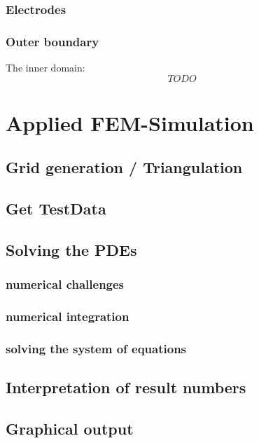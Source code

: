 \documentclass[parskip=half, titlepage=yes, 12pt, BCOR=12mm, DIV=calc]{scrartcl}
\begin{document}
\subsubsection{Electrodes}

\subsubsection{Outer boundary}

The inner domain: 
\begin{equation}
    TODO
\end{equation}



\section{Applied FEM-Simulation}

\subsection{Grid generation / Triangulation}

\subsection{Get TestData}

\subsection{Solving the PDEs}
\subsubsection{numerical challenges}
\subsubsection{numerical integration}
\subsubsection{solving the system of equations}

\subsection{Interpretation of result numbers}

\subsection{Graphical output}
\end{document}
